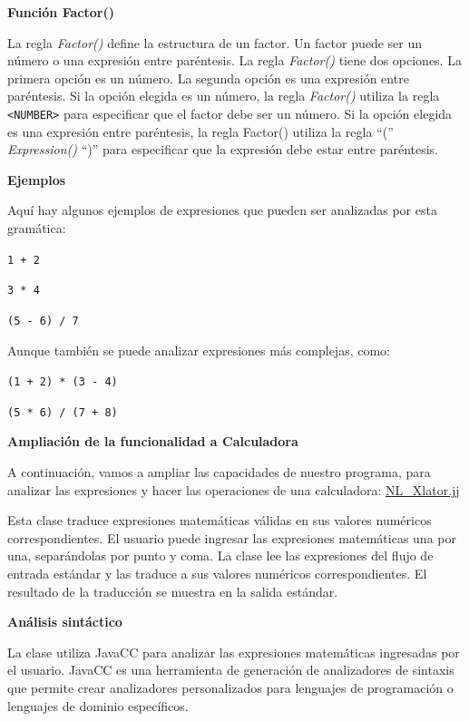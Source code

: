 \textbf{Función Factor()}
\lstset{inputencoding=utf8/latin1}

La regla \textit{Factor()} define la estructura de un factor. Un factor puede ser un número o una expresión entre paréntesis. La regla \textit{Factor()} tiene dos opciones. La primera opción es un número. La segunda opción es una expresión entre paréntesis. Si la opción elegida es un número, la regla \textit{Factor()} utiliza la regla \lstinline|<NUMBER>| para especificar que el factor debe ser un número. Si la opción elegida es una expresión entre paréntesis, la regla Factor() utiliza la regla ``('' \textit{Expression()} ``)'' para especificar que la expresión debe estar entre paréntesis.

\textbf{Ejemplos}

Aquí hay algunos ejemplos de expresiones que pueden ser analizadas por esta gramática:

\begin{center}
	\lstinline|1 + 2|

	\lstinline|3 * 4|

	\lstinline|(5 - 6) / 7|
\end{center}

Aunque también se puede analizar expresiones más complejas, como:
\begin{center}
	\lstinline|(1 + 2) * (3 - 4)|

	\lstinline|(5 * 6) / (7 + 8)|
\end{center}

\textbf{Ampliación de la funcionalidad a Calculadora}

A continuación, vamos a ampliar las capacidades de nuestro programa, para analizar las expresiones y hacer las operaciones de una calculadora: \hyperref[sec:nlxlator]{NL\_Xlator.jj}

%

Esta clase traduce expresiones matemáticas válidas en sus valores numéricos correspondientes. El usuario puede ingresar las expresiones matemáticas una por una, separándolas por punto y coma. La clase lee las expresiones del flujo de entrada estándar y las traduce a sus valores numéricos correspondientes. El resultado de la traducción se muestra en la salida estándar.

\textbf{Análisis sintáctico}

La clase utiliza JavaCC para analizar las expresiones matemáticas ingresadas por el usuario. JavaCC es una herramienta de generación de analizadores de sintaxis que permite crear analizadores personalizados para lenguajes de programación o lenguajes de dominio específicos.

